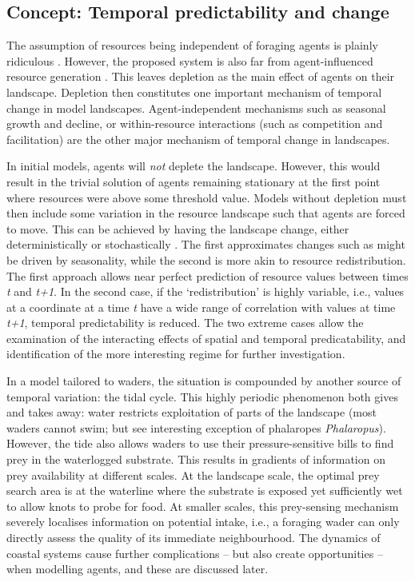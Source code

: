 \subsection{Concept: Temporal predictability and change}

The assumption of resources being independent of foraging agents is plainly ridiculous \citep{vandekoppel1997, jefferies2006, bijleveld2015c}. However, the proposed system is also far from agent-influenced resource generation \citep[see e.g.][]{leroux2018}. This leaves depletion as the main effect of agents on their landscape. Depletion then constitutes one important mechanism of temporal change in model landscapes. Agent-independent mechanisms such as seasonal growth and decline, or within-resource interactions (such as competition and facilitation) are the other major mechanism of temporal change in landscapes.

In initial models, agents will \emph{not} deplete the landscape. However, this would result in the trivial solution of agents remaining stationary at the first point where resources were above some threshold value. Models without depletion must then include some variation in the resource landscape such that agents are forced to move. This can be achieved by having the landscape change, either deterministically or stochastically \citep[see parellel with][]{botero2015}. The first approximates changes such as might be driven by seasonality, while the second is more akin to resource redistribution. The first approach allows near perfect prediction of resource values between times \emph{t} and \emph{t+1}. In the second case, if the `redistribution' is highly variable, i.e., values at a coordinate at a time \emph{t} have a wide range of correlation with values at time \emph{t+1}, temporal predictability is reduced. The two extreme cases allow the examination of the interacting effects of spatial and temporal predicatability, and identification of the more interesting regime for further investigation.

In a model tailored to waders, the situation is compounded by another source of temporal variation: the tidal cycle. This highly periodic phenomenon both gives and takes away: water restricts exploitation of parts of the landscape (most waders cannot swim; but see interesting exception of phalaropes \emph{Phalaropus}). However, the tide also allows waders to use their pressure-sensitive bills \citep{piersma1998} to find prey in the waterlogged substrate. This results in gradients of information on prey availability at different scales. At the landscape scale, the optimal prey search area is at the waterline where the substrate is exposed yet sufficiently wet to allow knots to probe for food. At smaller scales, this prey-sensing mechanism severely localises information on potential intake, i.e., a foraging wader can only directly assess the quality of its immediate neighbourhood. The dynamics of coastal systems cause further complications -- but also create opportunities -- when modelling agents, and these are discussed later.

